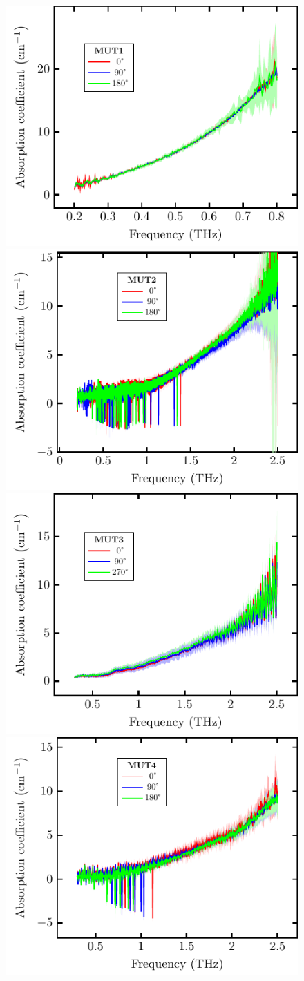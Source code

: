 \begin{figure}[H]
\centering
\subcaptionbox{\label{fig:ceramic_MUT1_abs}}
    {\hspace*{-2em}\includegraphics[width=0.45\linewidth]{images/7_appendix/plots/real_abs/MUT1.pdf}}
\qquad
\subcaptionbox{\label{fig:ceramic_MUT2_abs}}
    {\hspace*{-2em}\includegraphics[width=0.45\linewidth]{images/7_appendix/plots/real_abs/MUT2.pdf}}
\subcaptionbox{\label{fig:ceramic_MUT3_abs}}
    {\hspace*{-2em}\includegraphics[width=0.45\linewidth]{images/7_appendix/plots/real_abs/MUT3.pdf}}
\qquad
\subcaptionbox{\label{fig:ceramic_MUT4_abs}}
    {\hspace*{-2em}\includegraphics[width=0.45\linewidth]{images/7_appendix/plots/real_abs/MUT4.pdf}}

\end{figure}
